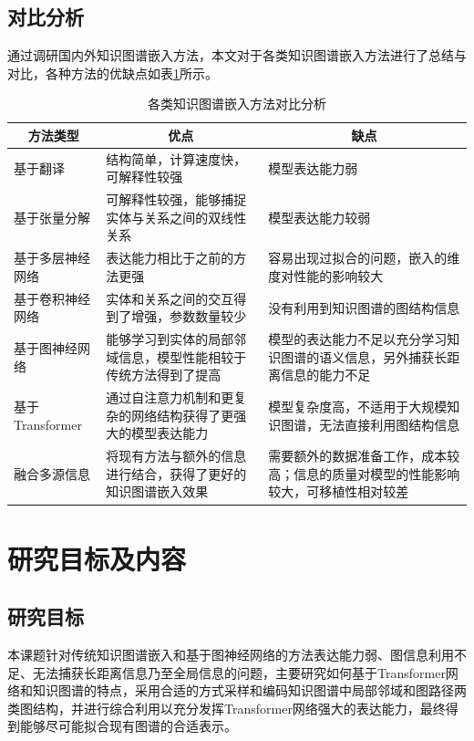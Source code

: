 \subsection{对比分析}
通过调研国内外知识图谱嵌入方法，本文对于各类知识图谱嵌入方法进行了总结与对比，各种方法的优缺点如表\ref{ComparativeAnalysis}所示。
\begin{table}[htbp]
  \renewcommand\arraystretch{1.5}
  \caption{各类知识图谱嵌入方法对比分析}
  \label{ComparativeAnalysis}
  \centering
  
  \begin{tabular}{lp{6cm}p{5cm}}
    \toprule
    \multicolumn{1}{c}{方法类型} & \multicolumn{1}{c}{优点} & \multicolumn{1}{c}{缺点}\\
    \midrule
    基于翻译 & 结构简单，计算速度快，可解释性较强& 模型表达能力弱\\
    基于张量分解 & 可解释性较强，能够捕捉实体与关系之间的双线性关系 & 模型表达能力较弱\\
    基于多层神经网络 & 表达能力相比于之前的方法更强 & 容易出现过拟合的问题，嵌入的维度对性能的影响较大\\
    基于卷积神经网络 & 实体和关系之间的交互得到了增强，参数数量较少&没有利用到知识图谱的图结构信息\\
    基于图神经网络 & 能够学习到实体的局部邻域信息，模型性能相较于传统方法得到了提高 & 模型的表达能力不足以充分学习知识图谱的语义信息，另外捕获长距离信息的能力不足\\
    基于Transformer &通过自注意力机制和更复杂的网络结构获得了更强大的模型表达能力 & 模型复杂度高，不适用于大规模知识图谱，无法直接利用图结构信息\\
    融合多源信息 & 将现有方法与额外的信息进行结合，获得了更好的知识图谱嵌入效果 & 需要额外的数据准备工作，成本较高；信息的质量对模型的性能影响较大，可移植性相对较差\\
    \bottomrule
  \end{tabular}
\end{table}

\section{研究目标及内容}
\subsection{研究目标}
本课题针对传统知识图谱嵌入和基于图神经网络的方法表达能力弱、图信息利用不足、无法捕获长距离信息乃至全局信息的问题，主要研究如何基于Transformer网络和知识图谱的特点，采用合适的方式采样和编码知识图谱中局部邻域和图路径两类图结构，并进行综合利用以充分发挥Transformer网络强大的表达能力，最终得到能够尽可能拟合现有图谱的合适表示。

